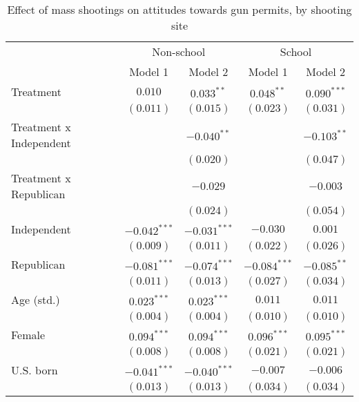 
\begin{table}
\caption{Effect of mass shootings on attitudes towards gun permits, by shooting site}
\begin{center}
\begin{tabular}{l c c c c}
\toprule
 & \multicolumn{2}{c}{Non-school} & \multicolumn{2}{c}{School} \\
\cmidrule(lr){2-3} \cmidrule(lr){4-5}
 & Model 1 & Model 2 & Model 1 & Model 2 \\
\midrule
Treatment               & $0.010$        & $0.033^{**}$   & $0.048^{**}$   & $0.090^{***}$  \\
                        & $(0.011)$      & $(0.015)$      & $(0.023)$      & $(0.031)$      \\
Treatment x Independent &                & $-0.040^{**}$  &                & $-0.103^{**}$  \\
                        &                & $(0.020)$      &                & $(0.047)$      \\
Treatment x Republican  &                & $-0.029$       &                & $-0.003$       \\
                        &                & $(0.024)$      &                & $(0.054)$      \\
Independent             & $-0.042^{***}$ & $-0.031^{***}$ & $-0.030$       & $0.001$        \\
                        & $(0.009)$      & $(0.011)$      & $(0.022)$      & $(0.026)$      \\
Republican              & $-0.081^{***}$ & $-0.074^{***}$ & $-0.084^{***}$ & $-0.085^{**}$  \\
                        & $(0.011)$      & $(0.013)$      & $(0.027)$      & $(0.034)$      \\
Age (std.)              & $0.023^{***}$  & $0.023^{***}$  & $0.011$        & $0.011$        \\
                        & $(0.004)$      & $(0.004)$      & $(0.010)$      & $(0.010)$      \\
Female                  & $0.094^{***}$  & $0.094^{***}$  & $0.096^{***}$  & $0.095^{***}$  \\
                        & $(0.008)$      & $(0.008)$      & $(0.021)$      & $(0.021)$      \\
U.S. born               & $-0.041^{***}$ & $-0.040^{***}$ & $-0.007$       & $-0.006$       \\
                        & $(0.013)$      & $(0.013)$      & $(0.034)$      & $(0.034)$      \\

\end{tabular}
\end{center}
\end{table}
